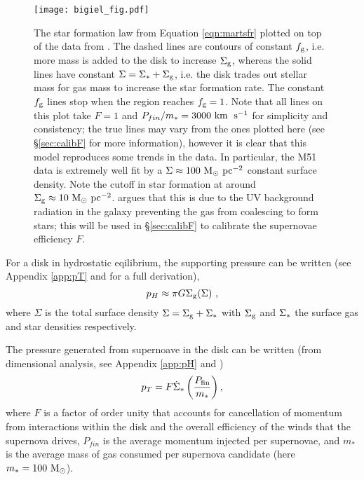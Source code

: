 \begin{figure}
    \centering
    \texttt{[image: bigiel\_fig.pdf]}
    \caption{The star formation law from Equation \ref{eqn:martsfr} plotted on top of the data from \citet{bigiel_star_2008}. The dashed lines are contours of constant $f_\mathrm{g}$, i.e. more mass is added to the disk to increase $\Sigma_\mathrm{g}$, whereas the solid lines have constant $\Sigma = \Sigma_* + \Sigma_\mathrm{g}$, i.e. the disk trades out stellar mass for gas mass to increase the star formation rate. The constant $f_\mathrm{g}$ lines stop when the region reaches $f_\mathrm{g}=1$. Note that all lines on this plot take $F=1$ and $P_{fin}/m_* = 3000 ~\mathrm{km}\;~\mathrm{s}^{-1}$ for simplicity and consistency; the true lines may vary from the ones plotted here (see \S \ref{sec:calibF} for more information), however it is clear that this model reproduces some trends in the data. In particular, the M51 data is extremely well fit by a $\Sigma \approx 100 ~\mathrm{M}_{\odot} ~\mathrm{pc}^{-2}$ constant surface density. Note the cutoff in star formation at around $\Sigma_\mathrm{g} \approx 10 ~\mathrm{M}_{\odot} ~\mathrm{pc}^{-2}$. \citet{schaye_star_2004} argues that this is due to the UV background radiation in the galaxy preventing the gas from coalescing to form stars; this will be used in \S \ref{sec:calibF} to calibrate the supernovae efficiency $F$.}
    \label{fig:bigielwithmart}
\end{figure}

For a disk in hydrostatic eqilibrium, the supporting pressure can be written (see Appendix \ref{app:pT} and \citet{ostriker_maximally_2011} for a full derivation),
\begin{equation}
\label{eqn:hydeq}
p_H \approx \pi G \Sigma_\mathrm{g} (\Sigma)~,
\end{equation}
where $\Sigma$ is the total surface density $\Sigma = \Sigma_\mathrm{g} + \Sigma_*$ with $\Sigma_\mathrm{g}$ and $\Sigma_*$ the surface gas and star densities respectively.

The pressure generated from supernoave in the disk can be written (from dimensional analysis, see Appendix \ref{app:pH} and \citet{martizzi_supernova_2015})
\begin{equation}
\label{eqn:turb}
p_T = F \dot{\Sigma}_* \left(\frac{P_\mathrm{fin}}{m_*}\right),
\end{equation}
where $F$ is a factor of order unity that accounts for cancellation of momentum from interactions within the disk and the overall efficiency of the winds that the supernova drives, $P_{fin}$ is the average momentum injected per supernovae, and $m_*$ is the average mass of gas consumed per supernova candidate (here $m_* = 100 ~\mathrm{M}_{\odot}$).

